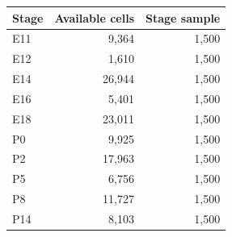 \begin{tabular}{lrr}\toprule
Stage & Available cells & Stage sample \\ \midrule
E11 & 9,364 & 1,500 \\
E12 & 1,610 & 1,500 \\
E14 & 26,944 & 1,500 \\
E16 & 5,401 & 1,500 \\
E18 & 23,011 & 1,500 \\
P0 & 9,925 & 1,500 \\
P2 & 17,963 & 1,500 \\
P5 & 6,756 & 1,500 \\
P8 & 11,727 & 1,500 \\
P14 & 8,103 & 1,500 \\
\bottomrule\end{tabular}
